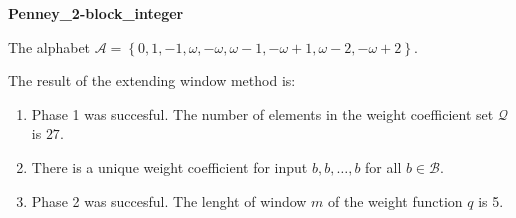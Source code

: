 \begin{exmp}
\textbf{ Penney\_2-block\_integer }

\label{ex:Penney2-blockinteger}

The alphabet $\mathcal{A} =\left\{0, 1, -1, \omega, -\omega, \omega - 1, -\omega + 1, \omega - 2, -\omega + 2\right\}$.

The result of the extending window method is:
\begin{enumerate}
    \item Phase 1 was succesful.
The number of elements in the weight coefficient set $\mathcal{Q}$ is $27$.

    \item There is a unique weight coefficient for input $b,b,\dots,b$ for all $b\in\mathcal{B}$.

    \item Phase 2 was succesful.
The lenght of window $m$ of the weight function $q$ is 5.
\end{enumerate}
\end{exmp}
